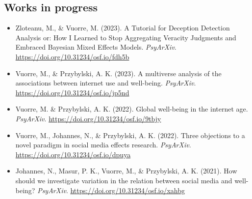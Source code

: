 \documentclass[12pt, a4paper]{article}
\begin{document}
\subsection*{Works in progress}
\begin{itemize}
  \item Zloteanu, M., \& Vuorre, M. (2023). A Tutorial for Deception Detection Analysis or: How I Learned to Stop Aggregating Veracity Judgments and Embraced Bayesian Mixed Effects Models. \emph{PsyArXiv}. \url{https://doi.org/10.31234/osf.io/fdh5b}
  \item Vuorre, M., \& Przybylski, A. K. (2023). A multiverse analysis of the associations between internet use and well-being. \emph{PsyArXiv}. \url{https://doi.org/10.31234/osf.io/jp5nd}
  \item Vuorre, M. \& Przybylski, A. K. (2022). Global well-being in the internet age. \emph{PsyArXiv}. \url{https://doi.org/10.31234/osf.io/9tbjy}
  \item Vuorre, M., Johannes, N., \& Przybylski, A. K. (2022). Three objections to a novel paradigm in social media effects research. \emph{PsyArXiv}. \url{https://doi.org/10.31234/osf.io/dpuya}
  \item Johannes, N., Masur, P. K., Vuorre, M., \& Przybylski, A. K. (2021). How should we investigate variation in the relation between social media and well-being? \emph{PsyArXiv}. \url{https://doi.org/10.31234/osf.io/xahbg}
\end{itemize}
\end{document}
